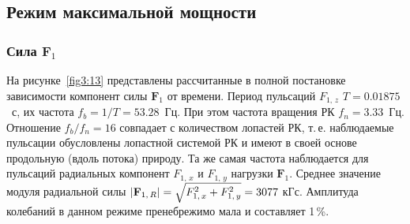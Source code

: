 \vspace*{-1mm}

\subsection{Режим максимальной мощности}
\label{s:361}
\subsubsection{Сила $\textbf{F}_1$}
\label{s:3611}
На рисунке~\ref{fig3:13} представлены рассчитанные в полной постановке зависимости компонент 
силы $\textbf{F}_{1}$ от времени.
Период пульсаций $F_{1,\,z}$   $T = 0.01875$~с, их частота $f_b ={1}/{T} = 53.28$~Гц.
При этом частота вращения РК  $f_n  = 3.33$~Гц. Отношение  ${f_b}/{f_n}=16$  совпадает с количеством 
лопастей РК, т.\,е. наблюдаемые пульсации обусловлены лопастной системой РК и имеют в своей основе 
продольную (вдоль потока) природу. Та же самая частота наблюдается
для пульсаций радиальных компонент $F_{1,\,x}$ и $F_{1,\,y}$ нагрузки $\textbf{F}_1$. Среднее значение 
модуля радиальной силы
$|{\bf{F}}_{1,\,R}| =\sqrt {F_{1,\,x}^2 +F_{1,\,y}^2}= 3077$ кГс. Амплитуда колебаний в данном 
режиме пренебрежимо мала и составляет 1\,\%.

